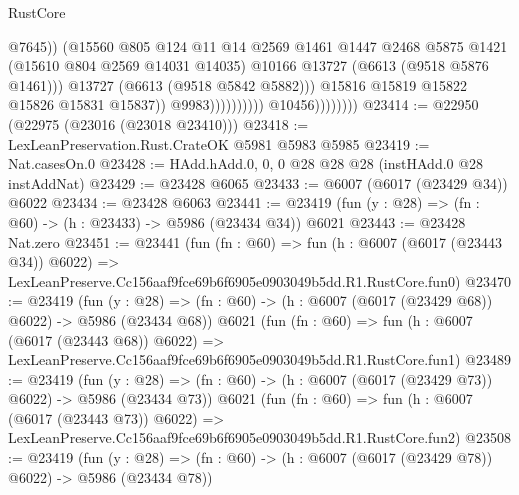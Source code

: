 \begin{lexlean}{RustCore}
\begin{coremodule}
                                                  @7645))
                                              (@15560
                                                @805
                                                @124
                                                @11
                                                @14
                                                @2569
                                                @1461
                                                @1447
                                                @2468
                                                @5875
                                                @1421
                                                (@15610 @804 @2569 @14031 @14035)
                                                @10166
                                                @13727
                                                (@6613 (@9518 @5876 @1461)))
                                              @13727
                                              (@6613 (@9518 @5842 @5882)))
                                            @15816
                                            @15819
                                            @15822
                                            @15826
                                            @15831
                                            @15837))
                                        @9983))))))))))
                    @10456))))))))
@23414 := @22950 (@22975 (@23016 (@23018 @23410)))
@23418 := LexLeanPreservation.Rust.CrateOK @5981 @5983 @5985
@23419 := Nat.casesOn.{0}
@23428 := HAdd.hAdd.{0, 0, 0} @28 @28 @28 (instHAdd.{0} @28 instAddNat)
@23429 := @23428 @6065
@23433 := @6007 (@6017 (@23429 @34)) @6022
@23434 := @23428 @6063
@23441 := @23419 (fun (y : @28) => (fn : @60) -> (h : @23433) -> @5986 (@23434 @34)) @6021
@23443 := @23428 Nat.zero
@23451 := @23441
    (fun (fn : @60) =>
    fun (h : @6007 (@6017 (@23443 @34)) @6022) =>
    LexLeanPreserve.Cc156aaf9fce69b6f6905e0903049b5dd.R1.RustCore.fun0)
@23470 := @23419
    (fun (y : @28) => (fn : @60) -> (h : @6007 (@6017 (@23429 @68)) @6022) -> @5986 (@23434 @68))
    @6021
    (fun (fn : @60) =>
    fun (h : @6007 (@6017 (@23443 @68)) @6022) =>
    LexLeanPreserve.Cc156aaf9fce69b6f6905e0903049b5dd.R1.RustCore.fun1)
@23489 := @23419
    (fun (y : @28) => (fn : @60) -> (h : @6007 (@6017 (@23429 @73)) @6022) -> @5986 (@23434 @73))
    @6021
    (fun (fn : @60) =>
    fun (h : @6007 (@6017 (@23443 @73)) @6022) =>
    LexLeanPreserve.Cc156aaf9fce69b6f6905e0903049b5dd.R1.RustCore.fun2)
@23508 := @23419
    (fun (y : @28) => (fn : @60) -> (h : @6007 (@6017 (@23429 @78)) @6022) -> @5986 (@23434 @78))

\end{coremodule}
\end{lexlean}
